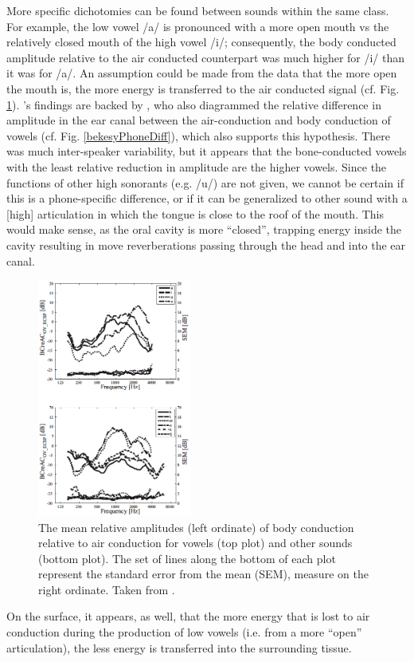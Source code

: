 \documentclass[dissertation,copyright]{uathesis}
\begin{document}
More specific dichotomies can be found between sounds within the same class. For example, the low vowel /a/ is pronounced with a more open mouth vs the relatively closed mouth of the high vowel /i/; consequently, the body conducted amplitude relative to the air conducted counterpart was much higher for /i/ than it was for /a/. An assumption could be made from the data that the more open the mouth is, the more energy is transferred to the air conducted signal (cf. Fig. \ref{BCrelACall}). \cite{reinfeldt:10}'s findings are backed by \cite{bekesy:60}, who also diagrammed the relative difference in amplitude in the ear canal between the air-conduction and body conduction of vowels (cf. Fig. \ref{bekesyPhoneDiff}), which also supports this hypothesis.  There was much inter-speaker variability, but it appears that the bone-conducted vowels with the least relative reduction in amplitude are the higher vowels.  Since the functions of other high sonorants (e.g. /u/) are not given, we cannot be certain if this is a phone-specific difference, or if it can be generalized to other sound with a [high] articulation in which the tongue is close to the roof of the mouth.  This would make sense, as the oral cavity is more ``closed'', trapping energy inside the cavity resulting in move reverberations passing through the head and into the ear canal.
%
\begin{figure}
\includegraphics[width=0.45\textwidth]{figure/BC_rel_AC_all.png}
\caption{The mean relative amplitudes (left ordinate) of body conduction relative to air conduction for vowels (top plot) and other sounds (bottom plot).  The set of lines along the bottom of each plot represent the standard error from the mean (SEM), measure on the right ordinate.  Taken from \cite{reinfeldt:10}.}
\label{BCrelACall}
\end{figure}
%
On the surface, it appears, as well, that the more energy that is lost to air conduction during the production of low vowels (i.e. from a more ``open'' articulation), the less energy is transferred into the surrounding tissue.
\end{document}
